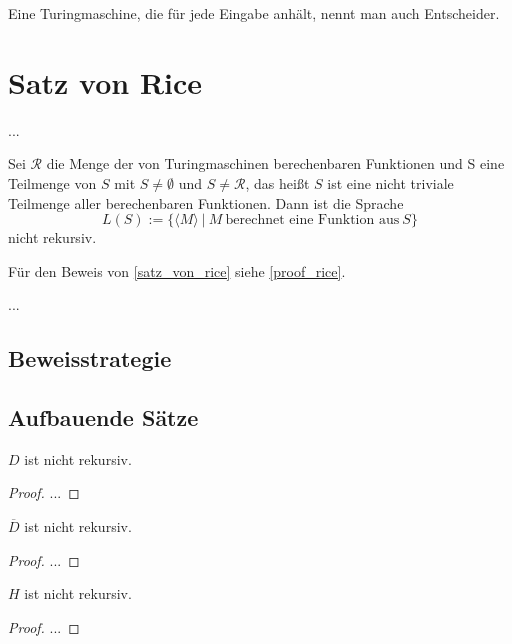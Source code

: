 \documentclass[journal]{IEEEtran}
\begin{document}
  Eine Turingmaschine, die für jede Eingabe anhält, nennt man auch Entscheider.

\section{Satz von Rice}


  ...

  \begin{theorem}\label{satz_von_rice}
    Sei $\mathcal{R}$ die Menge der von Turingmaschinen berechenbaren Funktionen und S eine Teilmenge von $S$  mit $S \ne \emptyset$ und $S \ne \mathcal{R}$, das heißt $S$ ist eine nicht triviale Teilmenge aller berechenbaren Funktionen. Dann ist die Sprache
    \begin{equation*}
      L(S) := \{\langle M \rangle \ \vert \ M \ \text{berechnet eine Funktion aus} \ S\}
    \end{equation*}
    nicht rekursiv.
  \end{theorem}

  Für den Beweis von \ref{satz_von_rice} siehe \ref{proof_rice}.

  ...

  \subsection{Beweisstrategie}

  \subsection{Aufbauende Sätze}

    \begin{theorem}
      $D$ ist nicht rekursiv.
    \end{theorem}
    \begin{proof}
      ...
    \end{proof}

    \begin{corollar}
      $\overline{D}$ ist nicht rekursiv.
    \end{corollar}
    \begin{proof}
      ...
    \end{proof}

    \begin{theorem}
      $H$ ist nicht rekursiv.
    \end{theorem}
    \begin{proof}
      ...
    \end{proof}
\end{document}

